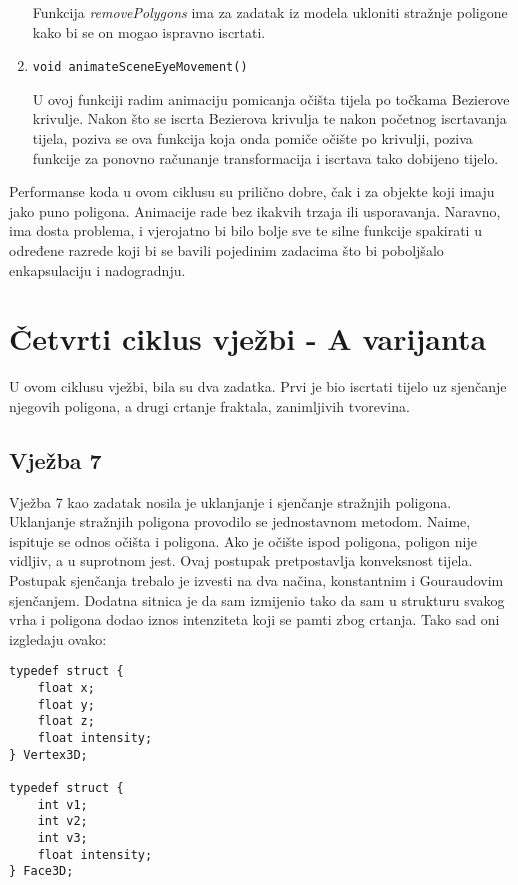 \documentclass[utf8]{fer}
\begin{document}
\begin{enumerate}
Funkcija \textit{removePolygons} ima za zadatak iz modela ukloniti stražnje poligone kako bi se on mogao ispravno iscrtati.

\item \begin{lstlisting}
void animateSceneEyeMovement()
\end{lstlisting}

U ovoj funkciji radim animaciju pomicanja očišta tijela po točkama Bezierove krivulje. Nakon što se iscrta Bezierova krivulja te nakon početnog iscrtavanja tijela, poziva se ova funkcija koja onda pomiče očište po krivulji, poziva funkcije za ponovno računanje transformacija i iscrtava tako dobijeno tijelo.

\end{enumerate}

Performanse koda u ovom ciklusu su prilično dobre, čak i za objekte koji imaju jako puno poligona. Animacije rade bez ikakvih trzaja ili usporavanja. Naravno, ima dosta problema, i vjerojatno bi bilo bolje sve te silne funkcije spakirati u određene razrede koji bi se bavili pojedinim zadacima što bi poboljšalo enkapsulaciju i nadogradnju.

\chapter{Četvrti ciklus vježbi - A varijanta}
U ovom ciklusu vježbi, bila su dva zadatka. Prvi je bio iscrtati tijelo uz sjenčanje njegovih poligona, a drugi crtanje fraktala, zanimljivih tvorevina. 

\section{Vježba 7}
Vježba 7 kao zadatak nosila je uklanjanje i sjenčanje stražnjih poligona. Uklanjanje stražnjih poligona provodilo se jednostavnom metodom. Naime, ispituje se odnos očišta i poligona. Ako je očište ispod poligona, poligon nije vidljiv, a u suprotnom jest. Ovaj postupak pretpostavlja konveksnost tijela. Postupak sjenčanja trebalo je izvesti na dva načina, konstantnim i Gouraudovim sjenčanjem. Dodatna sitnica je da sam izmijenio  tako da sam u strukturu svakog vrha i poligona dodao iznos intenziteta koji se pamti zbog crtanja. Tako sad oni izgledaju ovako:


\begin{lstlisting}
typedef struct {
    float x;
    float y;
    float z;
    float intensity;
} Vertex3D;

typedef struct {
    int v1;
    int v2;
    int v3;
    float intensity;
} Face3D;
\end{lstlisting}
\end{document}
